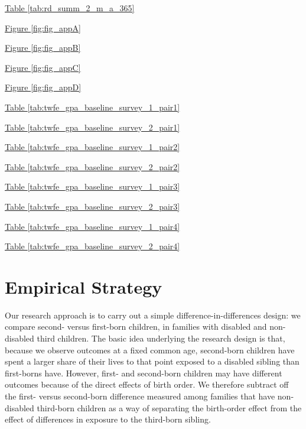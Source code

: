\hyperref[tab:rd_summ_2_m_a_365]{Table \ref{tab:rd_summ_2_m_a_365}}

\hyperref[fig:fig_appA]{Figure \ref{fig:fig_appA}}

\hyperref[fig:fig_appB]{Figure \ref{fig:fig_appB}}

\hyperref[fig:fig_appC]{Figure \ref{fig:fig_appC}}

\hyperref[fig:fig_appD]{Figure \ref{fig:fig_appD}}


\hyperref[tab:twfe_gpa_baseline_survey_1_pair1]{Table \ref{tab:twfe_gpa_baseline_survey_1_pair1}}

\hyperref[tab:twfe_gpa_baseline_survey_2_pair1]{Table \ref{tab:twfe_gpa_baseline_survey_2_pair1}}


\hyperref[tab:twfe_gpa_baseline_survey_1_pair2]{Table \ref{tab:twfe_gpa_baseline_survey_1_pair2}}

\hyperref[tab:twfe_gpa_baseline_survey_2_pair2]{Table \ref{tab:twfe_gpa_baseline_survey_2_pair2}}


\hyperref[tab:twfe_gpa_baseline_survey_1_pair3]{Table \ref{tab:twfe_gpa_baseline_survey_1_pair3}}

\hyperref[tab:twfe_gpa_baseline_survey_2_pair3]{Table \ref{tab:twfe_gpa_baseline_survey_2_pair3}}


\hyperref[tab:twfe_gpa_baseline_survey_1_pair4]{Table \ref{tab:twfe_gpa_baseline_survey_1_pair4}}

\hyperref[tab:twfe_gpa_baseline_survey_2_pair4]{Table \ref{tab:twfe_gpa_baseline_survey_2_pair4}}




\section{Empirical Strategy}\label{sec:empirical_strategy}

Our research approach is to carry out a simple difference-in-differences design: we compare second- versus first-born children, in families with disabled and non-disabled third children. The basic idea underlying the research design is that, because we observe outcomes at a fixed common age, second-born children have spent a larger share of their lives to that point exposed to a disabled sibling than first-borns have. However, first- and second-born children may have different outcomes because of the direct effects of birth order. We therefore subtract off the first- versus second-born difference measured among families that have non-disabled third-born children as a way of separating the birth-order effect from the effect of differences in exposure to the third-born sibling. 

